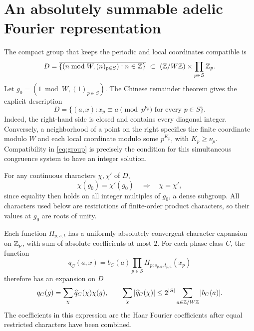 \section{An absolutely summable adelic Fourier representation}
\label{sec:fourier}

The compact group that keeps the periodic and local coordinates
compatible is
\[
D=\overline{\{(n\bmod W,(n)_{p\in S}):n\in\mathbb Z\}}
\ \subset\ (\mathbb Z/W\mathbb Z)\times\prod_{p\in S}\mathbb Z_p.
\]
Let \(g_0=(1\bmod W,(1)_{p\in S})\).
The Chinese remainder theorem gives the explicit description
\begin{equation}\label{eq:group}
D=\{(a,x):x_p\equiv a\pmod{p^{\nu_p}}\text{ for every }p\in S\}.
\end{equation}
Indeed, the right-hand side is closed and contains every diagonal
integer. Conversely, a neighborhood of a point on the right specifies
the finite coordinate modulo \(W\) and each local coordinate modulo
some \(p^{K_p}\), with \(K_p\geq\nu_p\). Compatibility in
\eqref{eq:group} is precisely the condition for this simultaneous
congruence system to have an integer solution.

For any continuous characters \(\chi,\chi'\) of \(D\),
\begin{equation}\label{eq:injective}
\chi(g_0)=\chi'(g_0)\quad\Longrightarrow\quad\chi=\chi',
\end{equation}
since equality then holds on all integer multiples of \(g_0\), a
dense subgroup. All characters used below are restrictions of
finite-order product characters, so their values at \(g_0\) are
roots of unity.

\begin{lemma}\label{lem:fourier}
Each function \(H_{p;s,t}\) has a uniformly absolutely convergent
character expansion on \(\mathbb Z_p\), with sum of absolute coefficients at
most \(2\). For each phase class \(C\), the function
\begin{equation}\label{eq:q}
q_C(a,x)=b_C(a)\prod_{p\in S}H_{p;s_{p,a},t_{p,a}}(x_p)
\end{equation}
therefore has an expansion on \(D\)
\begin{equation}\label{eq:q-fourier}
q_C(g)=\sum_{\chi}\widehat q_C(\chi)\chi(g),
\qquad
\sum_\chi|\widehat q_C(\chi)|
\leq 2^{|S|}\sum_{a\in\mathbb Z/W\mathbb Z}|b_C(a)|.
\end{equation}
The coefficients in this expression are the Haar Fourier coefficients
after equal restricted characters have been combined.
\end{lemma}

